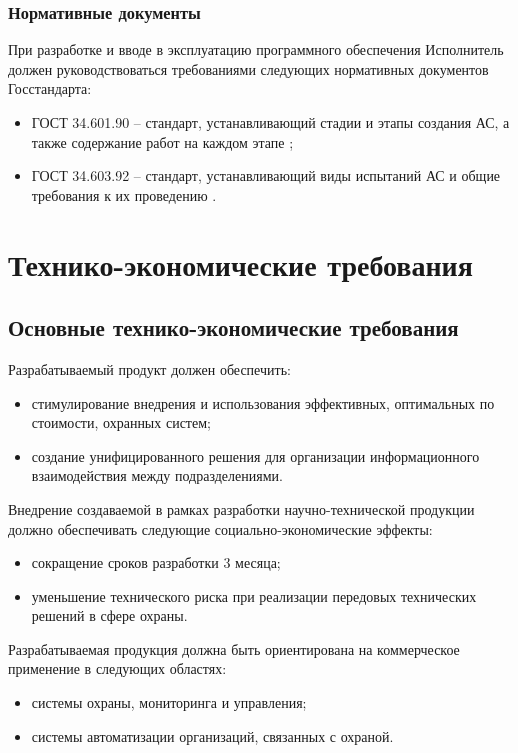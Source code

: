 			\subsubsection{Нормативные документы}
				При разработке и вводе в эксплуатацию программного обеспечения
				Исполнитель должен руководствоваться требованиями следующих
				нормативных документов Госстандарта:
				\begin{itemize}
					\item ГОСТ 34.601.90 – стандарт, устанавливающий стадии и этапы создания АС, а также содержание работ на каждом этапе \cite{gost90};
					\item ГОСТ 34.603.92 – стандарт, устанавливающий виды испытаний АС и общие требования к их проведению \cite{gost92}.
				\end{itemize}
	\section{Технико-экономические требования}
		\subsection{Основные технико-экономические требования}
			Разрабатываемый продукт должен обеспечить:
			\begin{itemize}
				\item стимулирование внедрения и использования эффективных, оптимальных по стоимости, охранных систем;
				\item создание унифицированного решения для организации информационного взаимодействия между подразделениями.
			\end{itemize}
			Внедрение создаваемой в рамках разработки научно-технической продукции должно обеспечивать следующие социально-экономические эффекты:
			\begin{itemize}
				\item сокращение сроков разработки 3 месяца;
				\item уменьшение технического риска при реализации передовых технических решений в сфере охраны.
			\end{itemize}
			Разрабатываемая продукция должна быть ориентирована на коммерческое применение в следующих областях:
			\begin{itemize}
				\item системы охраны, мониторинга и управления;
				\item системы автоматизации организаций, связанных с охраной.
			\end{itemize}

